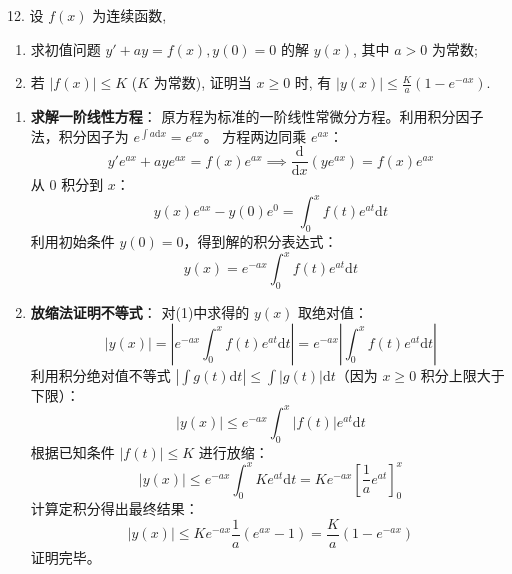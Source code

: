 \documentclass[lang=cn,11pt]{elegantbook}
\begin{document}
\begin{exercise}[一阶线性方程与积分不等式]
12. 设 $f(x)$ 为连续函数,
\begin{enumerate}
    \item[(1)] 求初值问题 $y'+ay=f(x), y(0)=0$ 的解 $y(x)$, 其中 $a>0$ 为常数;
    \item[(2)] 若 $|f(x)|\le K$ ($K$ 为常数), 证明当 $x\ge 0$ 时, 有 $|y(x)|\le \frac{K}{a}(1-e^{-ax})$.
\end{enumerate}
\end{exercise}
\begin{solution}
\begin{enumerate}
    \item[(1)] \textbf{求解一阶线性方程}：
    原方程为标准的一阶线性常微分方程。利用积分因子法，积分因子为 $e^{\int a \mathrm{d}x} = e^{ax}$。
    方程两边同乘 $e^{ax}$：
    \[
    y'e^{ax} + a y e^{ax} = f(x)e^{ax} \implies \frac{\mathrm{d}}{\mathrm{d}x} (y e^{ax}) = f(x)e^{ax}
    \]
    从 $0$ 积分到 $x$：
    \[
    y(x)e^{ax} - y(0)e^0 = \int_0^x f(t)e^{at} \mathrm{d}t
    \]
    利用初始条件 $y(0) = 0$，得到解的积分表达式：
    \[
    y(x) = e^{-ax} \int_0^x f(t)e^{at} \mathrm{d}t
    \]
    
    \item[(2)] \textbf{放缩法证明不等式}：
    对(1)中求得的 $y(x)$ 取绝对值：
    \[
    |y(x)| = \left| e^{-ax} \int_0^x f(t)e^{at} \mathrm{d}t \right| = e^{-ax} \left| \int_0^x f(t)e^{at} \mathrm{d}t \right|
    \]
    利用积分绝对值不等式 $\left| \int g(t) \mathrm{d}t \right| \le \int |g(t)| \mathrm{d}t$（因为 $x \ge 0$ 积分上限大于下限）：
    \[
    |y(x)| \le e^{-ax} \int_0^x |f(t)| e^{at} \mathrm{d}t
    \]
    根据已知条件 $|f(t)| \le K$ 进行放缩：
    \[
    |y(x)| \le e^{-ax} \int_0^x K e^{at} \mathrm{d}t = K e^{-ax} \left[ \frac{1}{a} e^{at} \right]_0^x
    \]
    计算定积分得出最终结果：
    \[
    |y(x)| \le K e^{-ax} \frac{1}{a} (e^{ax} - 1) = \frac{K}{a} (1 - e^{-ax})
    \]
    证明完毕。
\end{enumerate}
\end{solution}
\end{document}
